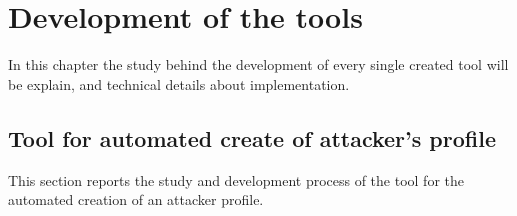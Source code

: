 
\chapter{Development of the tools}
\label{cap:tools}
In this chapter the study behind the development of every single created tool will be explain, and technical details about implementation.

\section{Tool for automated create of attacker's profile}
This section reports the study and development process of the tool for the automated creation of an attacker profile.

